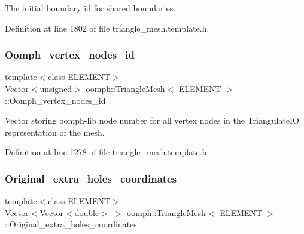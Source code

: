 The initial boundary id for shared boundaries. 



Definition at line 1802 of file triangle\+\_\+mesh.\+template.\+h.

\mbox{\label{classoomph_1_1TriangleMesh_a9fc2a4cae497a1b626293831b9824ca5}} 
\subsubsection{\texorpdfstring{Oomph\+\_\+vertex\+\_\+nodes\+\_\+id}{Oomph\_vertex\_nodes\_id}}
{\footnotesize\ttfamily template$<$class E\+L\+E\+M\+E\+NT$>$ \\
Vector$<$unsigned$>$ \hyperlink{classoomph_1_1TriangleMesh}{oomph\+::\+Triangle\+Mesh}$<$ E\+L\+E\+M\+E\+NT $>$\+::Oomph\+\_\+vertex\+\_\+nodes\+\_\+id\hspace{0.3cm}{\ttfamily [protected]}}



Vector storing oomph-\/lib node number for all vertex nodes in the Triangulate\+IO representation of the mesh. 



Definition at line 1278 of file triangle\+\_\+mesh.\+template.\+h.

\mbox{\label{classoomph_1_1TriangleMesh_a70bba1b4d0565fa95b1bff6b034a5b7c}} 
\subsubsection{\texorpdfstring{Original\+\_\+extra\+\_\+holes\+\_\+coordinates}{Original\_extra\_holes\_coordinates}}
{\footnotesize\ttfamily template$<$class E\+L\+E\+M\+E\+NT$>$ \\
Vector$<$Vector$<$double$>$ $>$ \hyperlink{classoomph_1_1TriangleMesh}{oomph\+::\+Triangle\+Mesh}$<$ E\+L\+E\+M\+E\+NT $>$\+::Original\+\_\+extra\+\_\+holes\+\_\+coordinates\hspace{0.3cm}{\ttfamily [protected]}}




